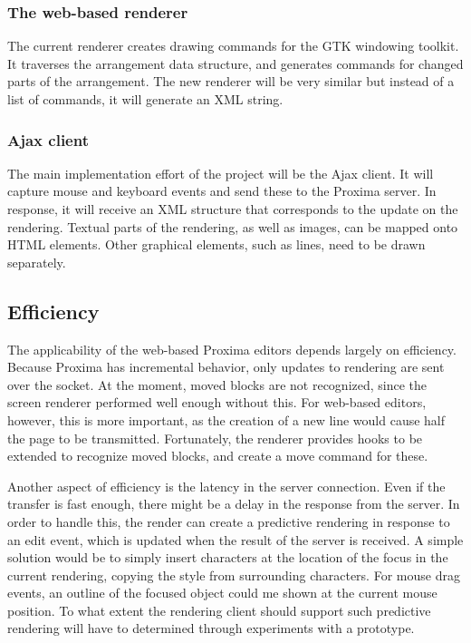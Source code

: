 \documentclass[10pt]{article}
\begin{document}
\subsubsection{The web-based renderer}

The current renderer creates drawing commands for the GTK windowing toolkit. It traverses the arrangement data structure, and generates commands for changed parts of the arrangement. The new renderer will be very similar but instead of a list of commands, it will generate an XML string.

\subsubsection{Ajax client}

The main implementation effort of the project will be the Ajax client. It will capture mouse and keyboard events and send these to the Proxima server. In response, it will receive an XML structure that corresponds to the update on the rendering. Textual parts of the rendering, as well as images, can be mapped onto HTML elements. Other graphical elements, such as lines, need to be drawn separately.

\subsection{Efficiency}

The applicability of the web-based Proxima editors depends largely on efficiency. Because Proxima has incremental behavior, only updates to rendering are sent over the socket. At the moment, moved blocks are not recognized, since the screen renderer performed well enough without this. For web-based editors, however, this is more important, as the creation of a new line would cause half the page to be transmitted. Fortunately, the renderer provides hooks to be extended to recognize moved blocks, and create a move command for these.

Another aspect of efficiency is the latency in the server connection. Even if the transfer is fast enough, there might be a delay in the response from the server. In order to handle this, the render can create a predictive rendering in response to an edit event, which is updated when the result of the server is received. A simple solution would be to simply insert characters at the location of the focus in the current rendering, copying the style from surrounding characters. For mouse drag events, an outline of the focused object could me shown at the current mouse position. To what extent the rendering client should support such predictive rendering will have to determined through experiments with a prototype.
\end{document}
